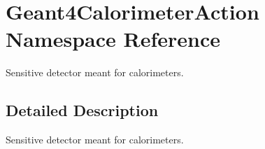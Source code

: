 \hypertarget{namespace_geant4_calorimeter_action}{
\section{Geant4CalorimeterAction Namespace Reference}
\label{namespace_geant4_calorimeter_action}
}


Sensitive detector meant for calorimeters.  


\subsection{Detailed Description}
Sensitive detector meant for calorimeters. 